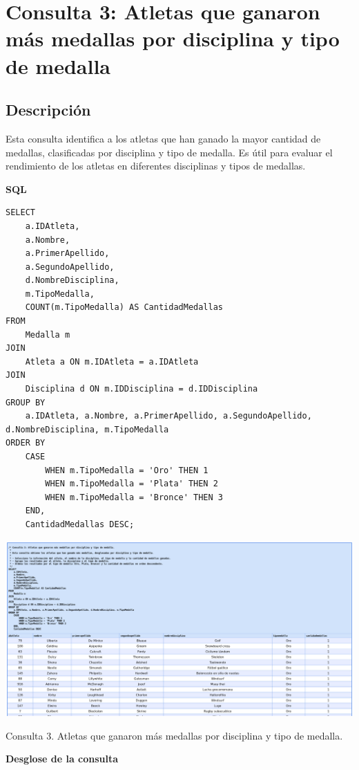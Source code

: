 \section*{Consulta 3: Atletas que ganaron más medallas por disciplina y tipo de medalla}

\subsection*{Descripción}
Esta consulta identifica a los atletas que han ganado la mayor cantidad de medallas, clasificadas por disciplina y tipo de medalla. Es útil para evaluar el rendimiento de los atletas en diferentes disciplinas y tipos de medallas.

\textbf{SQL}

\begin{verbatim}
SELECT 
    a.IDAtleta,
    a.Nombre,
    a.PrimerApellido,
    a.SegundoApellido,
    d.NombreDisciplina,
    m.TipoMedalla,
    COUNT(m.TipoMedalla) AS CantidadMedallas
FROM 
    Medalla m
JOIN 
    Atleta a ON m.IDAtleta = a.IDAtleta
JOIN 
    Disciplina d ON m.IDDisciplina = d.IDDisciplina
GROUP BY 
    a.IDAtleta, a.Nombre, a.PrimerApellido, a.SegundoApellido, d.NombreDisciplina, m.TipoMedalla
ORDER BY 
    CASE 
        WHEN m.TipoMedalla = 'Oro' THEN 1
        WHEN m.TipoMedalla = 'Plata' THEN 2
        WHEN m.TipoMedalla = 'Bronce' THEN 3
    END,
    CantidadMedallas DESC;
\end{verbatim}

\begin{center}
    \includegraphics[width=16.5cm]{../resources/Chapters/Consultas/Imagenes/Consulta3.jpeg} 
    
   Consulta 3. Atletas que ganaron más medallas por disciplina y tipo de medalla.
\end{center}

\textbf{Desglose de la consulta}

